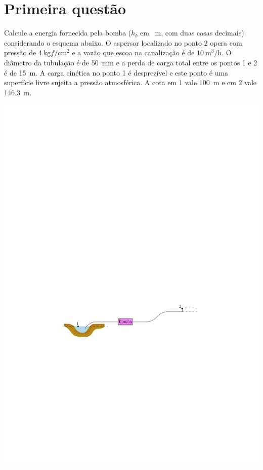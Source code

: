 \documentclass[a4paper, 12pt, brazilian]{article}
\begin{document}
	\section{Primeira questão}
	Calcule a energia fornecida pela bomba ($h_{b}$ em \SI{}{\meter}, com duas casas decimais) considerando o esquema abaixo. O aspersor localizado no ponto 2 opera com pressão de $\SI{4}{\kilogram f/\centi\meter^{2}}$ e a vazão que escoa na canalização é de $\SI{10}{\meter^{3}/\hour}$. O diâmetro da tubulação é de \SI{50}{\milli\meter} e a perda de carga total entre os pontos 1 e 2 é de \SI{15}{\meter}. A carga cinética no ponto 1 é desprezível e este ponto é uma superfície livre sujeita a pressão atmosférica. A cota em 1 vale \SI{100}{\meter} e em 2 vale \SI{146.3}{\meter}.
	\begin{center}
		\includegraphics[width=.9\linewidth]{assets/images/ex1}
	\end{center}
\end{document}
